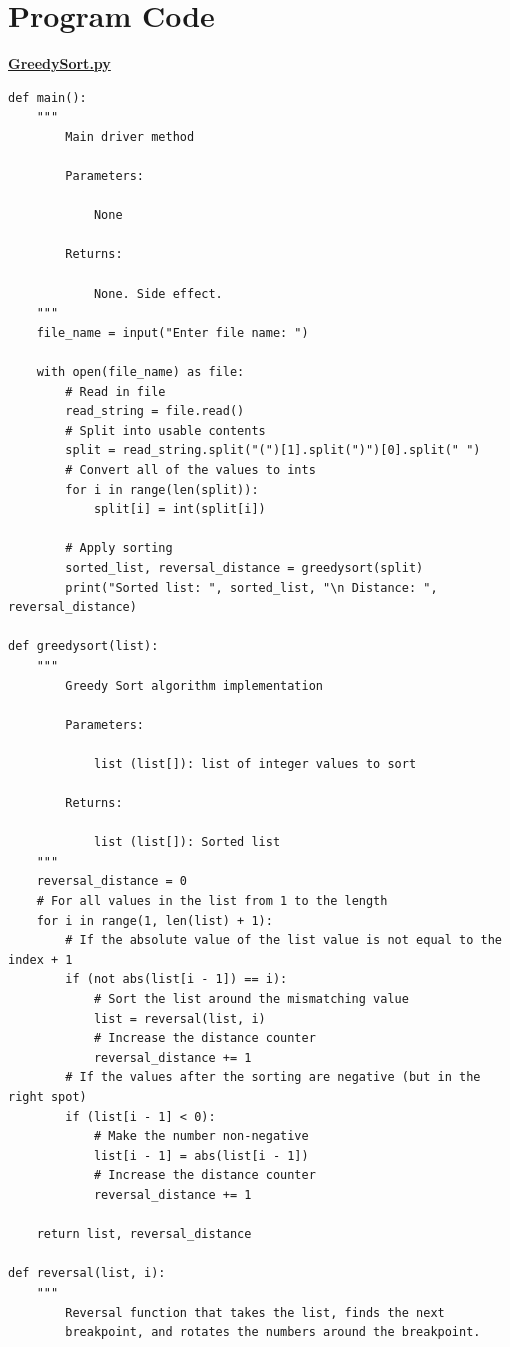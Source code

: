 \documentclass{article}
\begin{document}
\section*{Program Code}
\textbf{\underline{GreedySort.py}}
\begin{lstlisting}
def main():
    """
        Main driver method

        Parameters:

            None

        Returns:

            None. Side effect.
    """
    file_name = input("Enter file name: ")

    with open(file_name) as file:
        # Read in file
        read_string = file.read()
        # Split into usable contents
        split = read_string.split("(")[1].split(")")[0].split(" ")
        # Convert all of the values to ints
        for i in range(len(split)):
            split[i] = int(split[i])
        
        # Apply sorting
        sorted_list, reversal_distance = greedysort(split)
        print("Sorted list: ", sorted_list, "\n Distance: ", reversal_distance)
        
def greedysort(list):
    """
        Greedy Sort algorithm implementation

        Parameters:

            list (list[]): list of integer values to sort

        Returns:

            list (list[]): Sorted list
    """
    reversal_distance = 0
    # For all values in the list from 1 to the length
    for i in range(1, len(list) + 1):
        # If the absolute value of the list value is not equal to the index + 1
        if (not abs(list[i - 1]) == i):
            # Sort the list around the mismatching value
            list = reversal(list, i)
            # Increase the distance counter
            reversal_distance += 1
        # If the values after the sorting are negative (but in the right spot)
        if (list[i - 1] < 0):
            # Make the number non-negative
            list[i - 1] = abs(list[i - 1])
            # Increase the distance counter
            reversal_distance += 1

    return list, reversal_distance

def reversal(list, i):
    """
        Reversal function that takes the list, finds the next 
        breakpoint, and rotates the numbers around the breakpoint.


\end{lstlisting}
\end{document}
